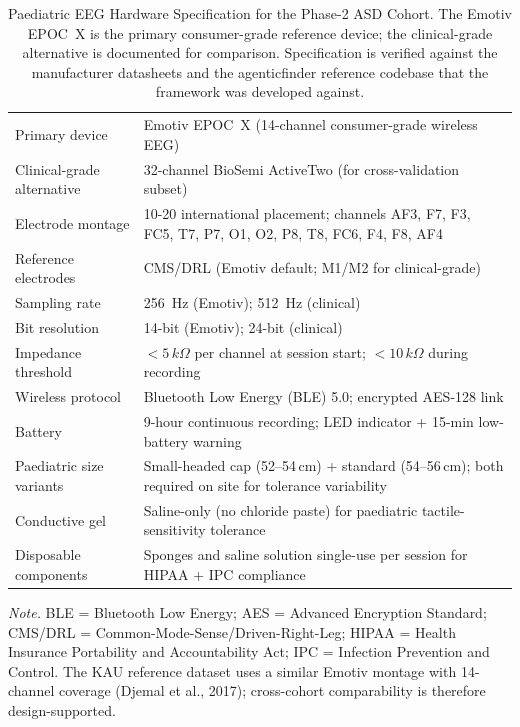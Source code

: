 {
\begin{xltabular}{\textwidth}{@{} >{\raggedright\arraybackslash}p{3.4cm} L @{}}
\caption[Paediatric EEG Hardware Specification]{Paediatric EEG Hardware Specification for the Phase-2 ASD Cohort. The Emotiv EPOC~X is the primary consumer-grade reference device; the clinical-grade alternative is documented for comparison. Specification is verified against the manufacturer datasheets and the agenticfinder reference codebase that the framework was developed against.}\label{tab:appg_hardware}\\
\toprule
{} &  \\
\midrule
\endfirsthead
\endhead
\bottomrule
\endlastfoot
Primary device & Emotiv EPOC~X (14-channel consumer-grade wireless EEG) \\
Clinical-grade alternative & 32-channel BioSemi ActiveTwo (for cross-validation subset) \\
Electrode montage & 10-20 international placement; channels AF3, F7, F3, FC5, T7, P7, O1, O2, P8, T8, FC6, F4, F8, AF4 \\
Reference electrodes & CMS/DRL (Emotiv default; M1/M2 for clinical-grade) \\
Sampling rate & 256~Hz (Emotiv); 512~Hz (clinical) \\
Bit resolution & 14-bit (Emotiv); 24-bit (clinical) \\
Impedance threshold & $<5\,k\Omega$ per channel at session start; $<10\,k\Omega$ during recording \\
Wireless protocol & Bluetooth Low Energy (BLE) 5.0; encrypted AES-128 link \\
Battery & 9-hour continuous recording; LED indicator + 15-min low-battery warning \\
Paediatric size variants & Small-headed cap (52--54\,cm) + standard (54--56\,cm); both required on site for tolerance variability \\
Conductive gel & Saline-only (no chloride paste) for paediatric tactile-sensitivity tolerance \\
Disposable components & Sponges and saline solution single-use per session for HIPAA + IPC compliance \\
\end{xltabular}}
\vspace{0.3em}\noindent\textit{Note.} BLE = Bluetooth Low Energy; AES = Advanced Encryption Standard; CMS/DRL = Common-Mode-Sense/Driven-Right-Leg; HIPAA = Health Insurance Portability and Accountability Act; IPC = Infection Prevention and Control. The KAU reference dataset uses a similar Emotiv montage with 14-channel coverage (Djemal et al., 2017); cross-cohort comparability is therefore design-supported.

